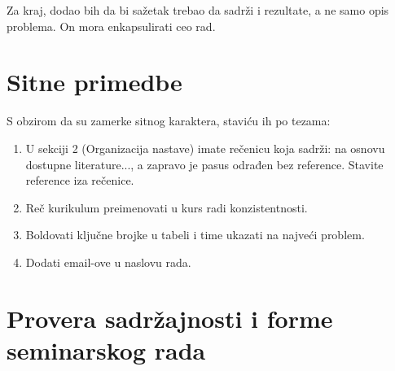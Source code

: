 \documentclass[a4paper]{report}
\begin{document}
Za kraj, dodao bih da bi sažetak trebao da sadrži i rezultate, a ne samo opis problema. On mora enkapsulirati ceo rad.

\section{Sitne primedbe}
S obzirom da su zamerke sitnog karaktera, staviću ih po tezama:
\begin{enumerate}
\item U sekciji 2 (Organizacija nastave) imate rečenicu koja sadrži: na osnovu dostupne literature..., a zapravo je pasus odrađen bez reference. Stavite reference iza rečenice.
\item Reč kurikulum preimenovati u kurs radi konzistentnosti.
\item Boldovati ključne brojke u tabeli i time ukazati na najveći problem.
\item Dodati email-ove u naslovu rada.
\end{enumerate}

\section{Provera sadržajnosti i forme seminarskog rada}
\end{document}
